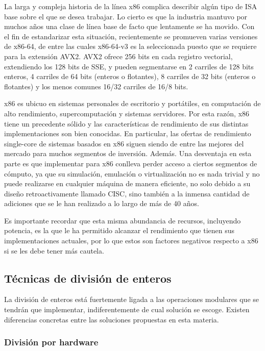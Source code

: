 \documentclass[conference, 14pt]{IEEEtran}
\begin{document}
	La larga y compleja historia de la línea x86 complica describir algún tipo
	de ISA base sobre el que se desea trabajar. Lo cierto es que la industria
	mantuvo por muchos años una clase de línea base de facto que lentamente se
	ha movido. Con el fin de estandarizar esta situación, recientemente se
	promueven varias versiones de x86-64, de entre las cuales x86-64-v3 es la
	seleccionada puesto que se requiere para la extensión AVX2. AVX2 ofrece 256
	bits en cada registro vectorial, extendiendo los 128 bits de SSE, y pueden
	segmentarse en 2 carriles de 128 bits enteros, 4 carriles de 64 bits
	(enteros o flotantes), 8 carriles de 32 bits (enteros o flotantes) y los
	menos comunes 16/32 carriles de 16/8 bits.

	  x86 es ubicuo en sistemas personales de escritorio y portátiles, en
	  computación de alto rendimiento, supercomputación y sistemas servidores.
	  Por esta razón, x86 tiene un precedente sólido y las características de
	  rendimiento de sus distintas implementaciones son bien conocidas. En
	  particular, las ofertas de rendimiento single-core de sistemas basados en
	  x86 siguen siendo de entre las mejores del mercado para muchos segmentos
	  de inversión. Además. Una desventaja en esta parte es que implementar
	  para x86 conlleva perder acceso a ciertos segmentos de cómputo, ya que su
	  simulación, emulación o virtualización no es nada trivial y no puede
	  realizarse en cualquier máquina de manera eficiente, no solo debido a su
	  diseño retroactivamente llamado CISC, sino también a la inmensa cantidad
	  de adiciones que se le han realizado a lo largo de más de 40 años.

	  Es importante recordar que esta misma abundancia de recursos, incluyendo
	  potencia, es la que le ha permitido alcanzar el rendimiento que tienen
	  sus implementaciones actuales, por lo que estos son factores negativos
	  respecto a x86 si se les debe tener más cautela.

\subsection{Técnicas de división de enteros}

La división de enteros está fuertemente ligada a las operaciones modulares que
	  se tendrán que implementar, indiferentemente de cual solución se escoge.
	  Existen diferencias concretas entre las soluciones propuestas en esta
	  materia.

\subsubsection{División por hardware}
\end{document}
